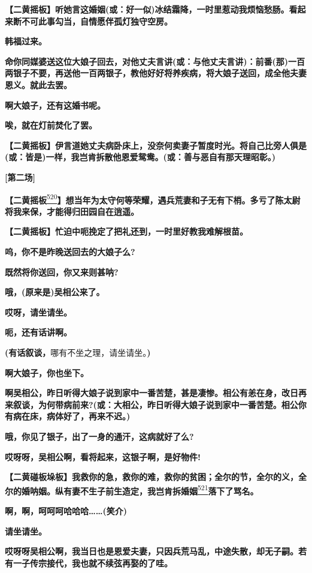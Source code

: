 \textbf{【二黄摇板】听她言这婚姻(或：好一似)冰结霜降，一时里惹动我烦恼愁肠。看起来断不可此事勾当，自情愿伴孤灯独守空房。}

\textbf{韩福过来。}

\textbf{命你同媒婆送这位大娘子回去，对他丈夫言讲(或：与他丈夫言讲)：前番(那)一百两银子不要，再送他一百两银子，教他好好将养疾病，将大娘子送回，成全他夫妻恩义。就此去罢。}

\textbf{啊大娘子，还有这婚书呢。}

\textbf{唉，就在灯前焚化了罢。}

\textbf{【二黄摇板】伊言道她丈夫病卧床上，没奈何卖妻子暂度时光。将自己比旁人俱是(或：皆是)一样，我岂肯拆散他恩爱鸳鸯。(或：善与恶自有那天理昭彰。)}

\textbf{{[}第二场{]}}

\textbf{【二黄摇板}\protect\hyperlink{fn520}{\textsuperscript{520}}\textbf{】想当年为太守何等荣耀，遇兵荒妻和子无有下梢。多亏了陈太尉将我来保，才能得归田园自在逍遥。}

\textbf{【二黄摇板】忙迫中呃挽定了把礼还到，一时里好教我难解根苗。}

\textbf{呜，你不是昨晚送回去的大娘子么?}

\textbf{既然将你送回，你又来则甚呐?}

\textbf{哦，(原来是)吴相公来了。}

\textbf{哎呀，请坐请坐。}

\textbf{呃，还有话讲啊。}

\textbf{(有话叙谈，}哪有不坐之理，请坐请坐。\textbf{)}

\textbf{啊大娘子，你也坐下。}

\textbf{啊吴相公，昨日听得大娘子说到家中一番苦楚，甚是凄惨。相公有恙在身，改日再来叙谈，为何带病前来?(或：大相公，昨日听得大娘子说到家中一番苦楚。相公你有病在床，病体好了，再来不迟。)}

\textbf{哦，你见了银子，出了一身的通汗，这病就好了么?}

\textbf{哎呀呀，吴相公啊，看将起来，这银子啊，是好物件!}

\textbf{【二黄碰板垛板】我救你的急，救你的难，救你的贫困；全尔的节，全尔的义，全尔的婚呐姻。纵有妻不生子前生造定，我岂肯拆婚姻}\protect\hyperlink{fn521}{\textsuperscript{521}}\textbf{落下了骂名。}

\textbf{啊，啊，呵呵呵哈哈哈\ldots{}\ldots{}(笑介)}

\textbf{请坐请坐。}

\textbf{哎呀呀吴相公啊，我当日也是恩爱夫妻，只因兵荒马乱，中途失散，却无子嗣。若有一子传宗接代，我也就不续弦再娶的了哇。}

